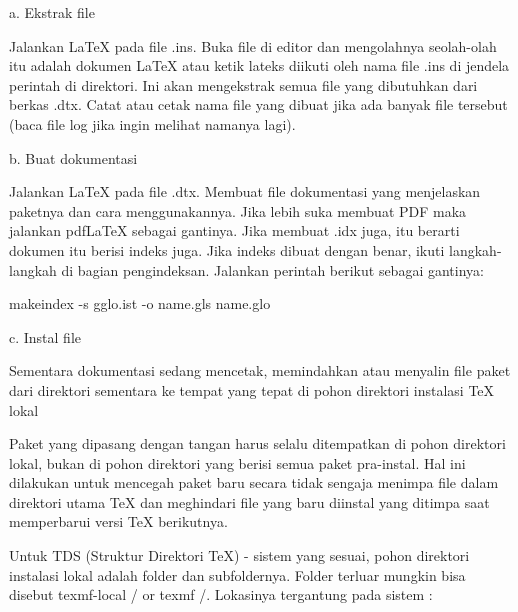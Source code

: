 \begin{enumerate}
\vspace{50pt}
\noindent a. Ekstrak file\par
\hspace{0.50in}Jalankan LaTeX pada file .ins. Buka file di editor dan mengolahnya seolah-olah itu adalah dokumen LaTeX atau ketik lateks diikuti oleh nama file .ins di jendela perintah di direktori. Ini akan mengekstrak semua file yang dibutuhkan dari berkas .dtx. Catat atau cetak nama file yang dibuat jika ada banyak file tersebut (baca file log jika ingin melihat namanya lagi). \par

\vspace{10pt}
\noindent b. Buat dokumentasi \par
\hspace{0.50in} Jalankan LaTeX pada file .dtx. Membuat file dokumentasi yang menjelaskan paketnya dan cara menggunakannya. Jika lebih suka membuat PDF maka jalankan pdfLaTeX sebagai gantinya. Jika membuat .idx juga, itu berarti dokumen itu berisi indeks juga. Jika indeks dibuat dengan benar, ikuti langkah-langkah di bagian pengindeksan. Jalankan perintah berikut sebagai gantinya: \par

makeindex -s gglo.ist -o name.gls name.glo \par

\vspace{10pt}
\noindent c. Instal file\par
\hspace{0.50in}Sementara dokumentasi sedang mencetak, memindahkan atau menyalin file paket dari direktori sementara ke tempat yang tepat di pohon direktori instalasi TeX lokal\par

\hspace{0.50in} Paket yang dipasang dengan tangan harus selalu ditempatkan di pohon direktori lokal, bukan di pohon direktori yang berisi semua paket pra-instal. Hal ini dilakukan untuk mencegah paket baru secara tidak sengaja menimpa file dalam direktori utama TeX dan meghindari file yang baru diinstal yang ditimpa saat memperbarui versi TeX berikutnya.\par

\hspace{0.50in}Untuk TDS (Struktur Direktori TeX) - sistem yang sesuai, pohon direktori instalasi lokal adalah folder dan subfoldernya. Folder terluar mungkin bisa disebut texmf-local / or texmf /. Lokasinya tergantung pada sistem :        


\end{enumerate}
